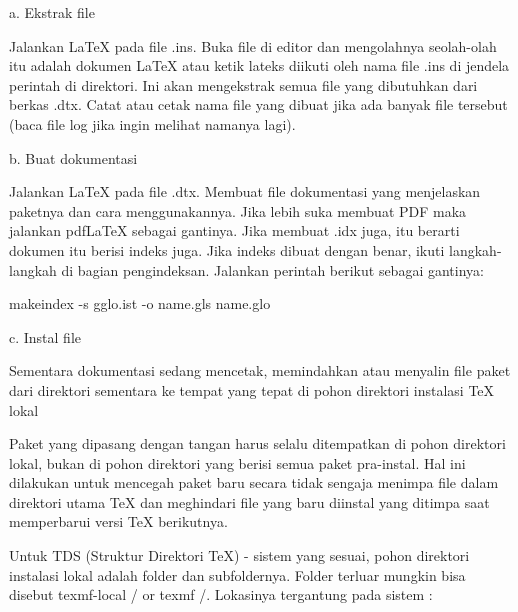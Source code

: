 \begin{enumerate}
\vspace{50pt}
\noindent a. Ekstrak file\par
\hspace{0.50in}Jalankan LaTeX pada file .ins. Buka file di editor dan mengolahnya seolah-olah itu adalah dokumen LaTeX atau ketik lateks diikuti oleh nama file .ins di jendela perintah di direktori. Ini akan mengekstrak semua file yang dibutuhkan dari berkas .dtx. Catat atau cetak nama file yang dibuat jika ada banyak file tersebut (baca file log jika ingin melihat namanya lagi). \par

\vspace{10pt}
\noindent b. Buat dokumentasi \par
\hspace{0.50in} Jalankan LaTeX pada file .dtx. Membuat file dokumentasi yang menjelaskan paketnya dan cara menggunakannya. Jika lebih suka membuat PDF maka jalankan pdfLaTeX sebagai gantinya. Jika membuat .idx juga, itu berarti dokumen itu berisi indeks juga. Jika indeks dibuat dengan benar, ikuti langkah-langkah di bagian pengindeksan. Jalankan perintah berikut sebagai gantinya: \par

makeindex -s gglo.ist -o name.gls name.glo \par

\vspace{10pt}
\noindent c. Instal file\par
\hspace{0.50in}Sementara dokumentasi sedang mencetak, memindahkan atau menyalin file paket dari direktori sementara ke tempat yang tepat di pohon direktori instalasi TeX lokal\par

\hspace{0.50in} Paket yang dipasang dengan tangan harus selalu ditempatkan di pohon direktori lokal, bukan di pohon direktori yang berisi semua paket pra-instal. Hal ini dilakukan untuk mencegah paket baru secara tidak sengaja menimpa file dalam direktori utama TeX dan meghindari file yang baru diinstal yang ditimpa saat memperbarui versi TeX berikutnya.\par

\hspace{0.50in}Untuk TDS (Struktur Direktori TeX) - sistem yang sesuai, pohon direktori instalasi lokal adalah folder dan subfoldernya. Folder terluar mungkin bisa disebut texmf-local / or texmf /. Lokasinya tergantung pada sistem :        


\end{enumerate}
